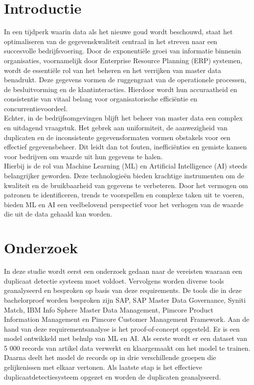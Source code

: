 \documentclass[a0,portrait]{hogent-poster}
\begin{document}
\begin{multicols}{2} %

\section{Introductie}

In een tijdperk waarin data als het nieuwe goud wordt beschouwd, staat het optimaliseren van de gegevenskwaliteit centraal in het streven naar een succesvolle bedrijfsvoering. Door de exponentiële groei van informatie binnenin organisaties, voornamelijk door Enterprise Resource Planning (ERP) systemen, wordt de essentiële rol van het beheren en het verrijken van master data benadrukt. Deze gegevens vormen de ruggengraat van de operationele processen, de besluitvorming en de klantinteracties. Hierdoor wordt hun accuraatheid en consistentie van vitaal belang voor organisatorische efficiëntie en concurrentievoordeel.
\\
Echter, in de bedrijfsomgevingen blijft het beheer van master data een complex en uitdagend vraagstuk. Het gebrek aan uniformiteit, de aanwezigheid van duplicaten en de inconsistente gegevensformaten vormen obstakels voor een effectief gegevensbeheer. Dit leidt dan tot fouten, inefficiënties en gemiste kansen voor bedrijven om waarde uit hun gegevens te halen. 
\\
Hierbij is de rol van Machine Learning (ML) en Artificial Intelligence (AI) steeds belangrijker geworden. Deze technologieën bieden krachtige instrumenten om de kwaliteit en de bruikbaarheid van gegevens te verbeteren. Door het vermogen om patronen te identificeren, trends te voorspellen en complexe taken uit te voeren, bieden ML en AI een veelbelovend perspectief voor het verhogen van de waarde die uit de data gehaald kan worden.

\section{Onderzoek}

In deze studie wordt eerst een onderzoek gedaan naar de vereisten waaraan een duplicaat detectie systeem moet voldoet. Vervolgens worden diverse tools geanalyseerd en besproken op basis van deze requirements. De tools die in deze bachelorproef worden besproken zijn SAP, SAP Master Data Governance, Syniti Match, IBM Info Sphere Master Data Management, Pimcore Product Information Management en Pimcore Customer Management Framework. Aan de hand van deze requirementsanalyse is het proof-of-concept opgesteld. Er is een model ontwikkeld met behulp van ML en AI. Als eerste wordt er een dataset van 5 000 records van artikel data verwerkt en klaargemaakt om het model te trainen. Daarna deelt het model de records op in drie verschillende groepen die gelijkenissen met elkaar vertonen. Als laatste stap is het effectieve duplicaatdetectiesysteem opgezet en worden de duplicaten geanalyseerd. 


\end{multicols}
\end{document}
